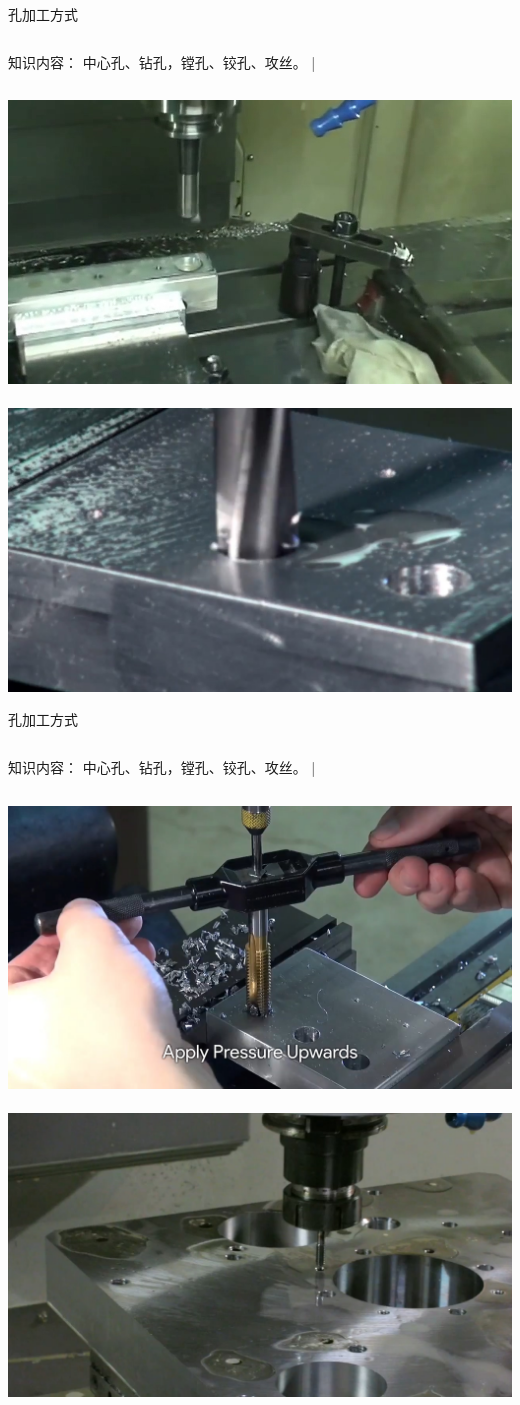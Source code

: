 \documentclass[utf8,zihao=-4,handout,smaller,aspectratio=1610]{ctexbeamer}
\begin{document}
\begin{frame}{孔加工方式}
	\begin{columns}
		\begin{block}{知识内容：}
			中心孔、钻孔，镗孔、铰孔、攻丝。
			|\end{block}
	\end{columns}

\vspace{25pt}

\includegraphics[width=0.5\linewidth,trim=0 0 0 0,clip,angle=0]{image/tang.jpg}~
\includegraphics[width=0.5\linewidth,trim=0 0 0 0,clip,angle=0]{image/jiaokong.jpg}
	
\end{frame}

\begin{frame}{孔加工方式}
	\begin{columns}
		\column{.05\textwidth}
		\column{.6\textwidth}
		\begin{block}{知识内容：}
			中心孔、钻孔，镗孔、铰孔、攻丝。
			|\end{block}
		\column{.0\textwidth}
	\end{columns}
	
	\vspace{25pt}
	
	\includegraphics[width=0.5\linewidth,trim=0 0 0 0,clip,angle=0]{image/shougongsi.jpg}~
	\includegraphics[width=0.5\linewidth,trim=0 0 0 0,clip,angle=0]{image/gangxigongsi.jpg}
	
\end{frame}
\end{document}
